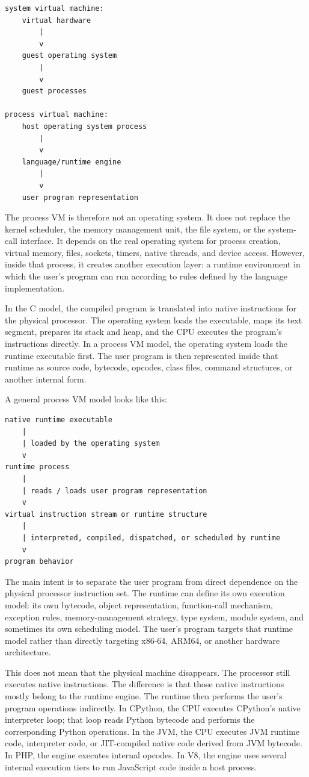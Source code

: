 \documentclass[a4paper,twoside]{report}
\begin{document}
\begin{verbatim}
system virtual machine:
    virtual hardware
        |
        v
    guest operating system
        |
        v
    guest processes

process virtual machine:
    host operating system process
        |
        v
    language/runtime engine
        |
        v
    user program representation
\end{verbatim}

The process VM is therefore not an operating system. It does not replace the kernel scheduler, the memory management unit, the file system, or the system-call interface. It depends on the real operating system for process creation, virtual memory, files, sockets, timers, native threads, and device access. However, inside that process, it creates another execution layer: a runtime environment in which the user's program can run according to rules defined by the language implementation.

In the C model, the compiled program is translated into native instructions for the physical processor. The operating system loads the executable, maps its text segment, prepares its stack and heap, and the CPU executes the program's instructions directly. In a process VM model, the operating system loads the runtime executable first. The user program is then represented inside that runtime as source code, bytecode, opcodes, class files, command structures, or another internal form.

A general process VM model looks like this:

\begin{verbatim}
native runtime executable
    |
    | loaded by the operating system
    v
runtime process
    |
    | reads / loads user program representation
    v
virtual instruction stream or runtime structure
    |
    | interpreted, compiled, dispatched, or scheduled by runtime
    v
program behavior
\end{verbatim}

The main intent is to separate the user program from direct dependence on the physical processor instruction set. The runtime can define its own execution model: its own bytecode, object representation, function-call mechanism, exception rules, memory-management strategy, type system, module system, and sometimes its own scheduling model. The user's program targets that runtime model rather than directly targeting x86-64, ARM64, or another hardware architecture.

This does not mean that the physical machine disappears. The processor still executes native instructions. The difference is that those native instructions mostly belong to the runtime engine. The runtime then performs the user's program operations indirectly. In CPython, the CPU executes CPython's native interpreter loop; that loop reads Python bytecode and performs the corresponding Python operations. In the JVM, the CPU executes JVM runtime code, interpreter code, or JIT-compiled native code derived from JVM bytecode. In PHP, the engine executes internal opcodes. In V8, the engine uses several internal execution tiers to run JavaScript code inside a host process.
\end{document}
